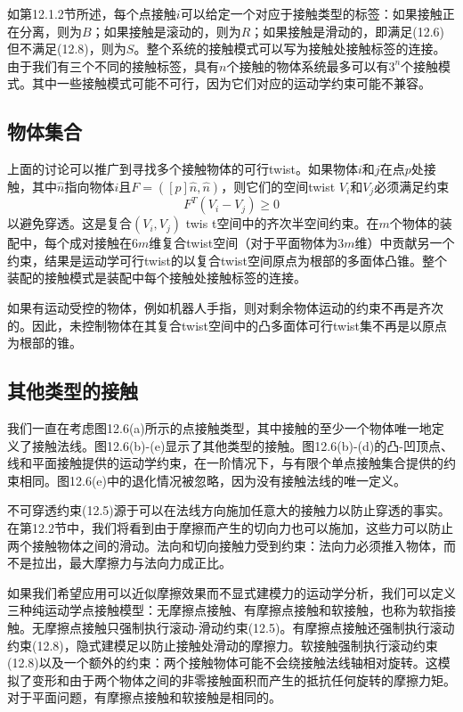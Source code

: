 \documentclass[12pt,a4paper]{article}
\begin{document}
如第12.1.2节所述，每个点接触$i$可以给定一个对应于接触类型的标签：如果接触正在分离，则为$B$；如果接触是滚动的，则为$R$；如果接触是滑动的，即满足(12.6)但不满足(12.8)，则为$S$。整个系统的接触模式可以写为接触处接触标签的连接。由于我们有三个不同的接触标签，具有$n$个接触的物体系统最多可以有$3^n$个接触模式。其中一些接触模式可能不可行，因为它们对应的运动学约束可能不兼容。

\subsection{物体集合}
\label{subsec:collections_of_bodies}

上面的讨论可以推广到寻找多个接触物体的可行twist。如果物体$i$和$j$在点$p$处接触，其中$\hat{n}$指向物体$i$且$F = ([p]\hat{n}, \hat{n})$，则它们的空间twist $V_i$和$V_j$必须满足约束
\begin{equation}
F^T (V_i - V_j) \geq 0
\label{eq:12.13}
\end{equation}
以避免穿透。这是复合$(V_i, V_j)$ twis t空间中的齐次半空间约束。在$m$个物体的装配中，每个成对接触在$6m$维复合twist空间（对于平面物体为$3m$维）中贡献另一个约束，结果是运动学可行twist的以复合twist空间原点为根部的多面体凸锥。整个装配的接触模式是装配中每个接触处接触标签的连接。

如果有运动受控的物体，例如机器人手指，则对剩余物体运动的约束不再是齐次的。因此，未控制物体在其复合twist空间中的凸多面体可行twist集不再是以原点为根部的锥。

\subsection{其他类型的接触}
\label{subsec:other_types_of_contacts}

我们一直在考虑图12.6(a)所示的点接触类型，其中接触的至少一个物体唯一地定义了接触法线。图12.6(b)-(e)显示了其他类型的接触。图12.6(b)-(d)的凸-凹顶点、线和平面接触提供的运动学约束，在一阶情况下，与有限个单点接触集合提供的约束相同。图12.6(e)中的退化情况被忽略，因为没有接触法线的唯一定义。

不可穿透约束(12.5)源于可以在法线方向施加任意大的接触力以防止穿透的事实。在第12.2节中，我们将看到由于摩擦而产生的切向力也可以施加，这些力可以防止两个接触物体之间的滑动。法向和切向接触力受到约束：法向力必须推入物体，而不是拉出，最大摩擦力与法向力成正比。

如果我们希望应用可以近似摩擦效果而不显式建模力的运动学分析，我们可以定义三种纯运动学点接触模型：无摩擦点接触、有摩擦点接触和软接触，也称为软指接触。无摩擦点接触只强制执行滚动-滑动约束(12.5)。有摩擦点接触还强制执行滚动约束(12.8)，隐式建模足以防止接触处滑动的摩擦力。软接触强制执行滚动约束(12.8)以及一个额外的约束：两个接触物体可能不会绕接触法线轴相对旋转。这模拟了变形和由于两个物体之间的非零接触面积而产生的抵抗任何旋转的摩擦力矩。对于平面问题，有摩擦点接触和软接触是相同的。
\end{document}
